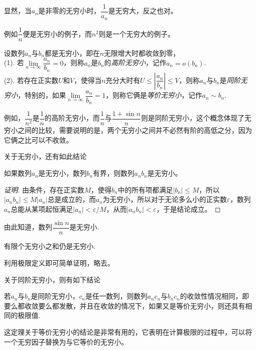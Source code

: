 显然，当$a_n$是非零的无穷小时，$\dfrac{1}{a_n}$是无穷大，反之也对。

例如$\dfrac{1}{n}$便是无穷小的例子，而$n^2$则是一个无穷大的例子。

\begin{definition}
   设数列$a_n$与$b_n$都是无穷小，即在$n$无限增大时都收敛到零，\\
  (1). 若$\lim\limits_{n \to \infty} \dfrac{a_n}{b_n} = 0$，则称$a_n$是$b_n$的\emph{高阶无穷小}，记作$a_n=o(b_n)$. \\
  (2). 若存在正实数$U$和$V$，使得当$n$充分大时有$U\leqslant \left| \dfrac{a_n}{b_n} \right| \leqslant V$，则称$a_n$与$b_n$是\emph{同阶无穷小}，特别的，如果$\lim\limits_{n \to \infty} \dfrac{a_n}{b_n} = 1$，则称它俩是\emph{等价无穷小}，记作$a_n \sim b_n$.
\end{definition}

例如，$\dfrac{1}{n^2}$是$\dfrac{1}{n}$的高阶无穷小，而$\dfrac{1}{n}$与$\dfrac{1+\sin{n}}{n}$则是同阶无穷小，这个概念体现了无穷小之间的比较，需要说明的是，两个无穷小之间并不必然有阶的高低之分，因为它俩之比可以不收敛。


关于无穷小，还有如此结论
\begin{theorem}
  如果数列$a_n$是无穷小，数列$b_n$有界，则数列$a_nb_n$是无穷小。
\end{theorem}

\begin{proof}[证明]
  由条件，存在正实数$M$，使得$b_n$中的所有项都满足$|b_n|\leqslant M$，所以$|a_nb_n| \leqslant M |a_n|$总是成立的，而$a_n$为无穷小，所以对于无论多么小的正实数$\varepsilon$，数列$a_n$总能从某项起恒满足$|a_n|<\varepsilon/M$，从而$|a_nb_n|<\varepsilon$，于是结论成立。
\end{proof}

由此知道，数列$\dfrac{\sin{n}}{n}$是无穷小.

\begin{theorem}
  有限个无穷小之和仍是无穷小.
\end{theorem}

利用极限定义即可简单证明，略去。

关于同阶无穷小，则有如下结论
\begin{theorem}
  若$a_n$与$b_n$是同阶无穷小，$c_n$是任一数列，则数列$a_nc_n$与$b_nc_n$的收敛性情况相同，即要么都收敛要么都发散，并且在收敛的情况下，如果又是等价无穷小，则还具有相同的极限值.
\end{theorem}

这定理关于等价无穷小的结论是非常有用的，它表明在计算极限的过程中，可以将一个无穷因子替换为与它等价的无穷小。

